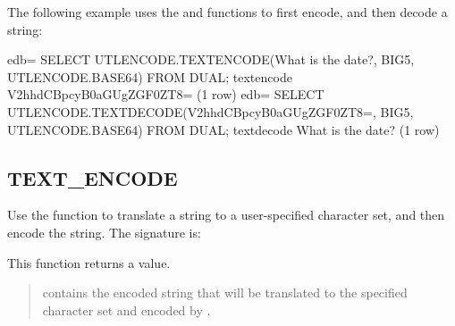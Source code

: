 \documentclass[letterpaper,10pt,english,openany,oneside]{sphinxmanual}
\begin{document}

The following example uses the  and  functions
to first encode, and then decode a string:

%
\begin{sphinxVerbatim}[commandchars=\\\{\}]
edb=\PYGZsh{} SELECT UTL\PYGZus{}ENCODE.TEXT\PYGZus{}ENCODE(\PYGZsq{}What is the date?\PYGZsq{}, \PYGZsq{}BIG5\PYGZsq{},
UTL\PYGZus{}ENCODE.BASE64) FROM DUAL;
text\PYGZus{}encode
\PYGZhy{}\PYGZhy{}\PYGZhy{}\PYGZhy{}\PYGZhy{}\PYGZhy{}\PYGZhy{}\PYGZhy{}\PYGZhy{}\PYGZhy{}\PYGZhy{}\PYGZhy{}\PYGZhy{}\PYGZhy{}\PYGZhy{}\PYGZhy{}\PYGZhy{}\PYGZhy{}\PYGZhy{}\PYGZhy{}\PYGZhy{}\PYGZhy{}\PYGZhy{}\PYGZhy{}\PYGZhy{}\PYGZhy{}
V2hhdCBpcyB0aGUgZGF0ZT8=
(1 row)
edb=\PYGZsh{} SELECT UTL\PYGZus{}ENCODE.TEXT\PYGZus{}DECODE(\PYGZsq{}V2hhdCBpcyB0aGUgZGF0ZT8=\PYGZsq{}, \PYGZsq{}BIG5\PYGZsq{},
UTL\PYGZus{}ENCODE.BASE64) FROM DUAL;
text\PYGZus{}decode
\PYGZhy{}\PYGZhy{}\PYGZhy{}\PYGZhy{}\PYGZhy{}\PYGZhy{}\PYGZhy{}\PYGZhy{}\PYGZhy{}\PYGZhy{}\PYGZhy{}\PYGZhy{}\PYGZhy{}\PYGZhy{}\PYGZhy{}\PYGZhy{}\PYGZhy{}\PYGZhy{}\PYGZhy{}
What is the date?
(1 row)
\end{sphinxVerbatim}

\newpage


\subsection{TEXT\_ENCODE}
\label{\detokenize{text_encode::doc}}\label{\detokenize{text_encode:text-encode}}
Use the  function to translate a string to a user-specified
character set, and then encode the string. The signature is:
\begin{quote}

\end{quote}

This function returns a  value.


\begin{quote}

 contains the encoded string that will be translated to the
specified character set and encoded by .
\end{quote}
\end{document}
